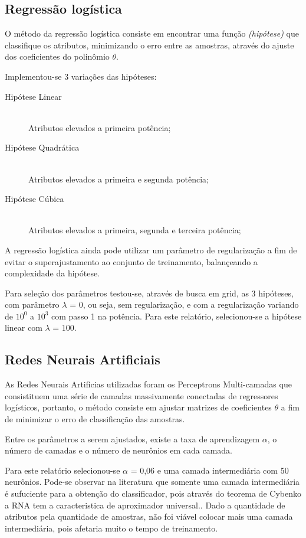 \subsection{Regressão logística}

O método da regressão logística consiste em encontrar uma função \emph{(hipótese)} que classifique os atributos, minimizando o erro entre as amostras, através do ajuste dos coeficientes do polinômio \(\theta\).

Implementou-se 3 variações das hipóteses:

\begin{description}
\item[Hipótese Linear] \hfill \\ Atributos elevados a primeira potência;
\item[Hipótese Quadrática] \hfill \\ Atributos elevados a primeira e segunda potência;
\item[Hipótese Cúbica] \hfill \\ Atributos elevados a primeira, segunda e terceira potência;
\end{description}

A regressão logística ainda pode utilizar um parâmetro de regularização a fim de evitar o superajustamento ao conjunto de treinamento, balançeando a complexidade da hipótese.

Para seleção dos parâmetros testou-se, através de busca em grid, as 3 hipóteses, com parâmetro \(\lambda\) = 0, ou seja, sem regularização, e com a regularização variando de \(10^0\) a \(10^3\) com passo 1 na potência. Para este relatório, selecionou-se a hipótese linear com \(\lambda\) = 100.

\subsection{Redes Neurais Artificiais}

As Redes Neurais Artificias utilizadas foram os Perceptrons Multi-camadas que consistituem uma série de camadas massivamente conectadas de regressores logísticos, portanto, o método consiste em ajustar matrizes de coeficientes \(\theta\) a fim de minimizar o erro de classificação das amostras.

Entre os parâmetros a serem ajustados, existe a taxa de aprendizagem \(\alpha\), o número de camadas e o número de neurônios em cada camada.

Para este relatório selecionou-se \(\alpha\) = 0,06 e uma camada intermediária com 50 neurônios. Pode-se observar na literatura que somente uma camada intermediária é sufuciente para a obtenção do classificador, pois através do teorema de Cybenko a RNA tem a caracteristica de aproximador universal.\cite{cybenko}. Dado a quantidade de atributos pela quantidade de amostras, não foi viável colocar mais uma camada intermediária, pois afetaria muito o tempo de treinamento.

